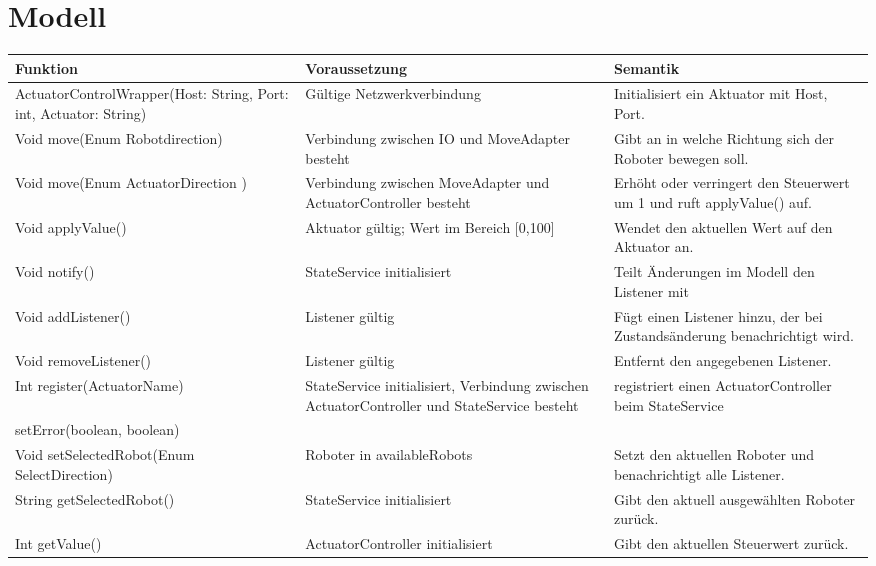 \section{Modell}
\begin{table}[h!]
    \centering
    \begin{tabular}{|p{5cm}|p{5cm}|p{5cm}|}
        \hline
        \textbf{Funktion} & \textbf{Voraussetzung} & \textbf{Semantik} \\
        \hline
        ActuatorControlWrapper(Host: String, Port: int, Actuator: String) & Gültige Netzwerkverbindung & Initialisiert ein Aktuator mit Host, Port. \\
        \hline
        Void move(Enum Robotdirection) & Verbindung zwischen IO und MoveAdapter besteht &  Gibt an in welche Richtung sich der Roboter bewegen soll. \\
        \hline
        Void move(Enum ActuatorDirection ) & Verbindung zwischen MoveAdapter und ActuatorController besteht & Erhöht oder verringert den Steuerwert um 1 und ruft applyValue() auf. \\
        \hline
        Void applyValue() & Aktuator gültig; Wert im Bereich [0,100] & Wendet den aktuellen Wert auf den Aktuator an. \\
		\hline
		Void notify() & StateService initialisiert & Teilt Änderungen im Modell den Listener mit \\
        \hline
        Void addListener() & Listener gültig & Fügt einen Listener hinzu, der bei Zustandsänderung benachrichtigt wird. \\
        \hline
        Void removeListener() & Listener gültig & Entfernt den angegebenen Listener. \\
        \hline
		Int register(ActuatorName) & StateService initialisiert, Verbindung zwischen ActuatorController und StateService besteht& registriert einen ActuatorController beim StateService \\
		\hline
		setError(boolean, boolean)& & \\
		\hline
        Void setSelectedRobot(Enum SelectDirection) & Roboter in availableRobots & Setzt den aktuellen Roboter und benachrichtigt alle Listener. \\
        \hline
        String getSelectedRobot() & StateService initialisiert & Gibt den aktuell ausgewählten Roboter zurück. \\
        \hline
        Int getValue() & ActuatorController initialisiert & Gibt den aktuellen Steuerwert zurück. \\
        \hline

\end{tabular}
\end{table}
